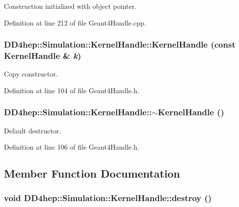Construction initialized with object pointer. 

Definition at line 212 of file Geant4Handle.cpp.\hypertarget{class_d_d4hep_1_1_simulation_1_1_kernel_handle_a39502e0ffd2e8d1ac079992e9359aee4}{
\subsubsection[{KernelHandle}]{\setlength{\rightskip}{0pt plus 5cm}DD4hep::Simulation::KernelHandle::KernelHandle (const {\bf KernelHandle} \& {\em k})}}
\label{class_d_d4hep_1_1_simulation_1_1_kernel_handle_a39502e0ffd2e8d1ac079992e9359aee4}


Copy constructor. 

Definition at line 104 of file Geant4Handle.h.\hypertarget{class_d_d4hep_1_1_simulation_1_1_kernel_handle_a66d1b2fafb35c14ac47720c9b184d01d}{
\subsubsection[{$\sim$KernelHandle}]{\setlength{\rightskip}{0pt plus 5cm}DD4hep::Simulation::KernelHandle::$\sim$KernelHandle ()}}
\label{class_d_d4hep_1_1_simulation_1_1_kernel_handle_a66d1b2fafb35c14ac47720c9b184d01d}


Default destructor. 

Definition at line 106 of file Geant4Handle.h.

\subsection{Member Function Documentation}
\hypertarget{class_d_d4hep_1_1_simulation_1_1_kernel_handle_a955f15990b4af24d3e862c45b99e041f}{
\subsubsection[{destroy}]{\setlength{\rightskip}{0pt plus 5cm}void DD4hep::Simulation::KernelHandle::destroy ()}}
\label{class_d_d4hep_1_1_simulation_1_1_kernel_handle_a955f15990b4af24d3e862c45b99e041f}



